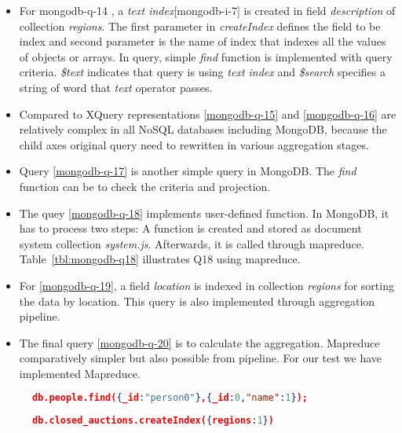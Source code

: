 \begin{itemize}
\item For {mongodb-q-14} , a \textit{text index}[{mongodb-i-7}] is created in field \textit{description} of collection \textit{regions}. The first parameter in \textit{createIndex} defines the field to be index and second parameter is the name of index that indexes all the values of objects or arrays.  In query, simple \textit{find} function is implemented with query criteria. \textit{\$text} indicates that query is using \textit{text index } and \textit{\$search} specifies a string of word that \textit{text} operator passes.

\item Compared to XQuery representations \ref{mongodb-q-15} and \ref{mongodb-q-16} are relatively complex in all NoSQL databases including MongoDB, because the child axes original query need to rewritten in various aggregation stages.

\item Query \ref{mongodb-q-17} is another simple query in MongoDB. The \textit{find} function can be to check the criteria and projection. 

\item The quey \ref{mongodb-q-18} implements user-defined function. In MongoDB, it has to process two steps: A function is created and stored as document system collection \textit{system.js}. Afterwards, it is called through mapreduce. Table~\ref{tbl:mongodb-q18} illustrates Q18 using mapreduce.

\item For \ref{mongodb-q-19}, a field  \textit{location} is indexed in collection \textit{regions} for sorting the data by location. This query is also implemented through aggregation pipeline. 
\item
The final query \ref{mongodb-q-20} is to calculate the aggregation. Mapreduce comparatively simpler but also possible from pipeline. For our test we have implemented Mapreduce. 
\end{itemize}


\begin{figure}
\centering
\begin{lstlisting}[language=JSON, caption=XMark Query Q1 in MongoDB, label=mongo-xmark-q1]
		db.people.find({_id:"person0"},{_id:0,"name":1});
\end{lstlisting}
\centering
\begin{lstlisting}[language=JSON, caption=MongoDB secondary Index, label=mongodb-create-index]
          db.closed_auctions.createIndex({regions:1})
\end{lstlisting}
\end{figure}


